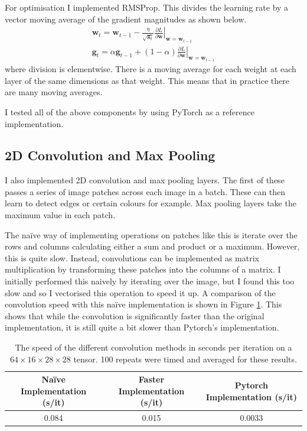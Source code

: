 \documentclass[11pt]{article}
\begin{document}
For optimisation I implemented RMSProp. This divides the learning rate by a vector moving average of the gradient 
magnitudes as shown below.
\begin{align*}
    \mathbf{w}_{t} = \mathbf{w}_{t - 1} - \frac{\eta}{\sqrt{\mathbf{g}_t}} \left.\frac{\partial L}{\partial \mathbf{w}}\right|_{
        \mathbf{w} = \mathbf{w}_{t - 1}} \\
        \mathbf{g}_t = \alpha \mathbf{g}_{t - 1} + (1 - \alpha) \left.\frac{\partial L}{\partial \mathbf{w}}\right|_{\mathbf{w} = 
        \mathbf{w}_{t - 1}}
\end{align*}
where division is elementwise. There is a moving average for each weight at each layer of the same dimensions as that
weight. This means that in practice there are many moving averages. 

I tested all of the above components by using PyTorch as a reference implementation.

\subsection*{2D Convolution and Max Pooling}
I also implemented 2D convolution and max pooling layers. The first of these passes a series of image patches across
each image in a batch. These can then learn to detect edges or certain colours for example. Max pooling layers take the 
maximum value in each patch. 

The na\"ive way of implementing operations on patches like this is iterate over the rows and columns calculating either
a sum and product or a maximum. However, this is quite slow. Instead, convolutions can be implemented as matrix 
multiplication by transforming these patches into the columns of a matrix. I initially performed this naively by 
iterating over the image, but I found this too slow and so I vectorised this operation to speed it up. A comparison
of the convolution speed with this na\"ive implementation is shown in Figure \ref{tab:speed}. This shows that while the 
convolution is significantly faster than the original implementation, it is still quite a bit slower than Pytorch's 
implementation. 

\begin{table}
    \centering
\begin{tabular}{c|c|c}
    \hline 
    Na\"ive Implementation (s/it) & Faster Implementation (s/it) & Pytorch Implementation (s/it)\\
    \hline 
    0.084 & 0.015 & 0.0033 \\
    \hline

\end{tabular}
\caption{The speed of the different convolution methods in seconds per iteration on a $64 \times 16 \times 28 \times 28$
tensor. 100 repeats were timed and averaged for these results.}
\label{tab:speed}
\end{table}
\end{document}
